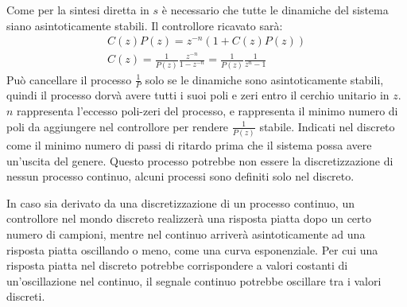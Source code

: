 \documentclass{article}
\numberwithin{equation}{subsection}
\begin{document}
Come per la sintesi diretta in $s$ è necessario che tutte le dinamiche del sistema siano asintoticamente stabili. Il controllore ricavato sarà:
\begin{gather}
    C(z)P(z)=z^{-n}(1+C(z)P(z))\\
    C(z)=\displaystyle\frac{1}{P(z)}\frac{z^{-n}}{1-z^{-n}}=\frac{1}{P(z)}\frac{1}{z^n-1}
\end{gather}
Può cancellare il processo $\displaystyle\frac{1}{P}$ solo se le dinamiche sono asintoticamente stabili, quindi il processo dorvà avere tutti i suoi poli e zeri entro il cerchio 
unitario in $z$. 
$n$ rappresenta l'eccesso poli-zeri del processo, e rappresenta il minimo numero di poli da aggiungere nel controllore per rendere $\displaystyle\frac{1}{P(z)}$ stabile. 
Indicati nel discreto come il minimo numero di passi di ritardo prima che il sistema possa avere un'uscita del genere. Questo processo potrebbe non essere la 
discretizzazione di nessun processo continuo, alcuni processi sono definiti solo nel discreto. 

In caso sia derivato da una discretizzazione di un processo continuo, un controllore nel mondo discreto realizzerà una risposta piatta dopo 
un certo numero di campioni, mentre nel continuo arriverà asintoticamente ad una risposta piatta oscillando o meno, come una curva esponenziale. Per cui una risposta 
piatta nel discreto potrebbe corrispondere a valori costanti di un'oscillazione nel continuo, il segnale continuo potrebbe oscillare tra i valori discreti. 

\begin{center}
\end{center}
\end{document}
